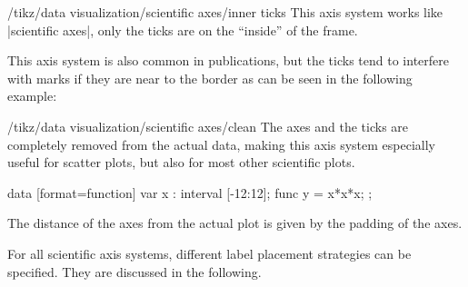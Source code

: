 \begin{key}{/tikz/data visualization/scientific axes/inner ticks}
    This axis system works like |scientific axes|, only the ticks are on the
    ``inside'' of the frame.
\begin{codeexample}[
    width=7cm,
    preamble={\usetikzlibrary{datavisualization.formats.functions}},
]
\end{codeexample}

    This axis system is also common in publications, but the ticks tend to
    interfere with marks if they are near to the border as can be seen in the
    following example:
\begin{codeexample}[preamble={\usetikzlibrary{datavisualization}}]
\end{codeexample}
\end{key}

\begin{key}{/tikz/data visualization/scientific axes/clean}
    The axes and the ticks are completely removed from the actual data, making
    this axis system especially useful for scatter plots, but also for most
    other scientific plots.
\begin{codeexample}[
    width=7.5cm,
    preamble={\usetikzlibrary{datavisualization.formats.functions}},
]
\tikz \datavisualization [
  scientific axes=clean,
  visualize as smooth line]
data [format=function] {
  var x : interval [-12:12];
  func y = \value x*\value x*\value x;
};
\end{codeexample}

    The distance of the axes from the actual plot is given by the padding of
    the axes.
\end{key}

For all scientific axis systems, different label placement strategies can be
specified. They are discussed in the following.

